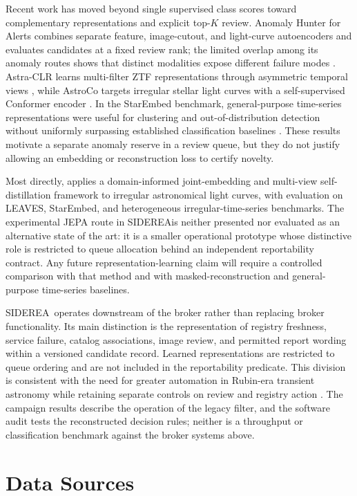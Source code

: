 \documentclass[11pt]{article}
\newcommand{\siderea}{SIDEREA}
\begin{document}
Recent work has moved beyond single supervised class scores toward complementary representations and explicit top-$K$ review. Anomaly Hunter for Alerts combines separate feature, image-cutout, and light-curve autoencoders and evaluates candidates at a fixed review rank; the limited overlap among its anomaly routes shows that distinct modalities expose different failure modes \citep{iskandarli2026}. Astra-CLR learns multi-filter ZTF representations through asymmetric temporal views \citep{majumder2026}, while AstroCo targets irregular stellar light curves with a self-supervised Conformer encoder \citep{tan2025}. In the StarEmbed benchmark, general-purpose time-series representations were useful for clustering and out-of-distribution detection without uniformly surpassing established classification baselines \citep{li2026}. These results motivate a separate anomaly reserve in a review queue, but they do not justify allowing an embedding or reconstruction loss to certify novelty.

Most directly, \citet{rui2026} applies a domain-informed joint-embedding and multi-view self-distillation framework to irregular astronomical light curves, with evaluation on LEAVES, StarEmbed, and heterogeneous irregular-time-series benchmarks. The experimental JEPA route in \siderea is neither presented nor evaluated as an alternative state of the art: it is a smaller operational prototype whose distinctive role is restricted to queue allocation behind an independent reportability contract. Any future representation-learning claim will require a controlled comparison with that method and with masked-reconstruction and general-purpose time-series baselines.

\siderea\ operates downstream of the broker rather than replacing broker functionality. Its main distinction is the representation of registry freshness, service failure, catalog associations, image review, and permitted report wording within a versioned candidate record. Learned representations are restricted to queue ordering and are not included in the reportability predicate. This division is consistent with the need for greater automation in Rubin-era transient astronomy while retaining separate controls on review and registry action \citep{rehemtulla2025}. The campaign results describe the operation of the legacy filter, and the software audit tests the reconstructed decision rules; neither is a throughput or classification benchmark against the broker systems above.

\section{Data Sources}
\label{sec:data}
\end{document}
